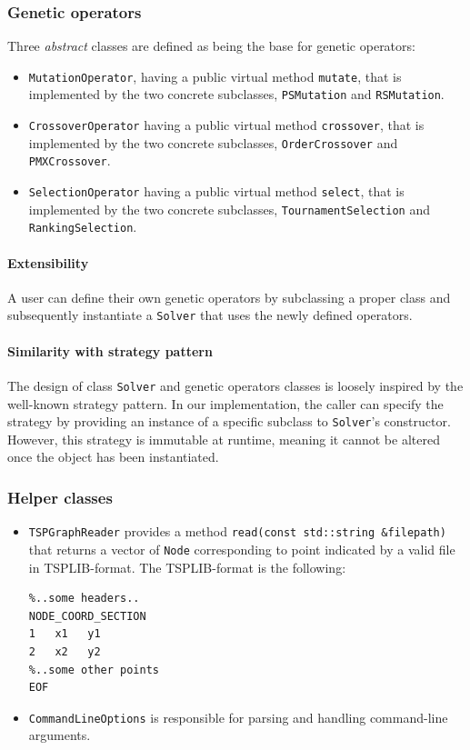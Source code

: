 \documentclass[../main.tex]{subfiles}
\begin{document}
\subsubsection{Genetic operators}
Three \emph{abstract} classes are defined as being the base for genetic operators:

\begin{itemize}
\item
\texttt{MutationOperator}, having a public virtual method \texttt{mutate}, that is implemented by the two concrete subclasses, \texttt{PSMutation} and \texttt{RSMutation}.
\item 
\texttt{CrossoverOperator} having a public virtual method \texttt{crossover}, that is implemented by the two concrete subclasses, \texttt{OrderCrossover} and \texttt{PMXCrossover}.
\item
\texttt{SelectionOperator} having a public virtual method \texttt{select}, that is implemented by the two concrete subclasses, \texttt{TournamentSelection} and \texttt{RankingSelection}.
\end{itemize}
\paragraph*{Extensibility}
A user can define their own genetic operators by subclassing a proper class and subsequently instantiate a \texttt{Solver} that uses the newly defined operators.

\paragraph*{Similarity with strategy pattern}
The design of class \texttt{Solver} and genetic operators classes is loosely inspired by  
the well-known strategy pattern. In our implementation, the caller can specify the strategy by providing an instance of a specific subclass to \texttt{Solver}'s constructor. However, this strategy is immutable at runtime, meaning it cannot be altered once the object has been instantiated.

\subsubsection{Helper classes}
\begin{itemize}
\item \texttt{TSPGraphReader} provides a method \texttt{read(const std::string \&filepath)} that returns a vector of \texttt{Node} corresponding to point indicated by a valid file in TSPLIB-format.
The TSPLIB-format is the following:
\begin{verbatim}
%..some headers..
NODE_COORD_SECTION
1   x1   y1
2   x2   y2
%..some other points
EOF
\end{verbatim}
\item \texttt{CommandLineOptions} is responsible for parsing and handling command-line arguments.
\end{itemize}
\end{document}
